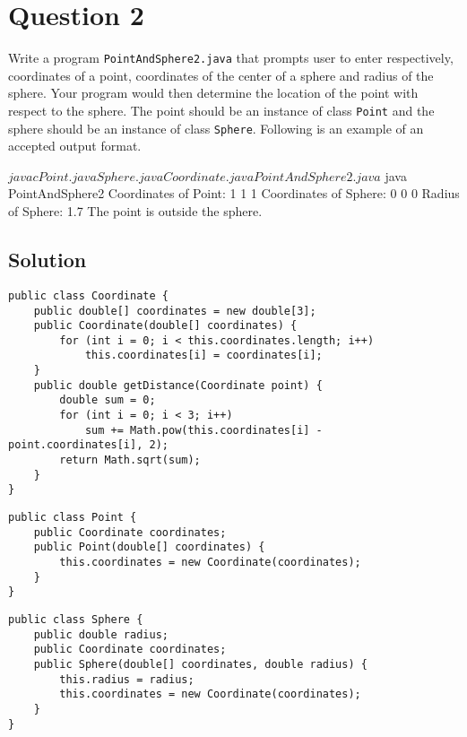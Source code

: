 \section*{Question 2}
Write a program \texttt{PointAndSphere2.java} that prompts user to enter respectively, coordinates of a point, coordinates of the center of a sphere and radius of the sphere.
Your program would then determine the location of the point with respect to the sphere.
The point should be an instance of class \texttt{Point} and the sphere should be an instance of class \texttt{Sphere}.
Following is an example of an accepted output format.

\begin{terminal}
$ javac Point.java Sphere.java Coordinate.java PointAndSphere2.java
$ java PointAndSphere2
Coordinates of Point: 1 1 1
Coordinates of Sphere: 0 0 0
Radius of Sphere: 1.7
The point is outside the sphere.
\end{terminal}

\subsection*{Solution}

\lstset{language=Java,tabsize=4}
\begin{lstlisting}
public class Coordinate {
	public double[] coordinates = new double[3];
	public Coordinate(double[] coordinates) {
		for (int i = 0; i < this.coordinates.length; i++)
			this.coordinates[i] = coordinates[i];
	}
	public double getDistance(Coordinate point) {
		double sum = 0;
		for (int i = 0; i < 3; i++)
			sum += Math.pow(this.coordinates[i] - point.coordinates[i], 2);
		return Math.sqrt(sum);
	}
}
\end{lstlisting}

\lstset{language=Java,tabsize=4}
\begin{lstlisting}
public class Point {
	public Coordinate coordinates;
	public Point(double[] coordinates) {
		this.coordinates = new Coordinate(coordinates);
	}
}
\end{lstlisting}

\newpage

\lstset{language=Java,tabsize=4}
\begin{lstlisting}
public class Sphere {
	public double radius;
	public Coordinate coordinates;
	public Sphere(double[] coordinates, double radius) {
		this.radius = radius;
		this.coordinates = new Coordinate(coordinates);
	}
}
\end{lstlisting}

